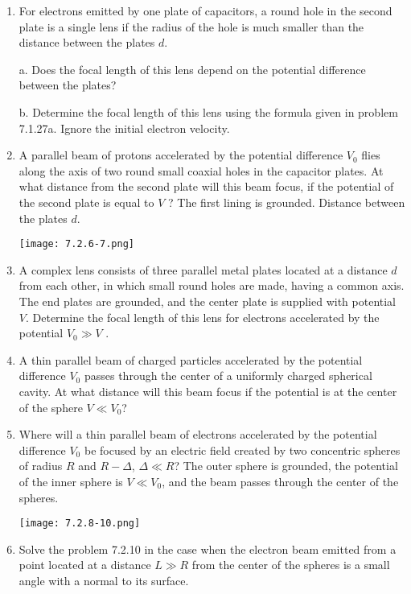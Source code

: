 \documentclass{article}
\begin{document}
\begin{enumerate}[label=7.2.\arabic*]
\item For electrons emitted by one plate of capacitors, a round hole in the second plate is a single lens if the radius of the hole is much smaller than the distance between the plates $d$.

a. Does the focal length of this lens depend on the potential difference between the plates?

b. Determine the focal length of this lens using the formula given in problem 7.1.27a. Ignore the initial electron velocity.

\item A parallel beam of protons accelerated by the potential difference $V_0$ flies along the axis of two round small coaxial holes in the capacitor plates. At what distance from the second plate will this beam focus, if the potential of the second plate is equal to $V$ ? The first lining is grounded. Distance between the plates $d$.

\begin{center}
    \texttt{[image: 7.2.6-7.png]}
\end{center}

\item A complex lens consists of three parallel metal plates located at a distance $d$ from each other, in which small round holes are made, having a common axis. The end plates are grounded, and the center plate is supplied with potential $V$. Determine the focal length of this lens for electrons accelerated by the potential $V_0 \gg V$ .

\item A thin parallel beam of charged particles accelerated by the potential difference $V_0$ passes through the center of a uniformly charged spherical cavity. At what distance will this beam focus if the potential is at the center of the sphere $V \ll V_0$?

\item Where will a thin parallel beam of electrons accelerated by the potential difference $V_0$ be focused by an electric field created by two concentric spheres of radius $R$ and $R - \Delta$, $\Delta \ll R$? The outer sphere is grounded, the potential of the inner sphere is $V \ll V_0$, and the beam passes through the center of the spheres.

\begin{center}
    \texttt{[image: 7.2.8-10.png]}
\end{center}

\item Solve the problem 7.2.10 in the case when the electron beam emitted from a point located at a distance $L \gg R$ from the center of the spheres is a small angle with a normal to its surface.


\end{enumerate}
\end{document}
